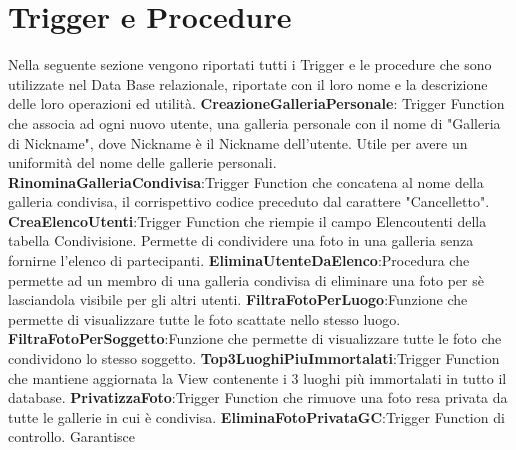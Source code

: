 \section{Trigger e Procedure}
Nella seguente sezione vengono riportati tutti i Trigger e le procedure che sono utilizzate nel Data Base relazionale, riportate con il loro nome e la descrizione delle loro operazioni ed utilità.
\newline
\newline
\textbf{CreazioneGalleriaPersonale}: Trigger Function che associa ad ogni nuovo utente, una galleria personale con il nome di "Galleria di Nickname", dove Nickname è il Nickname dell'utente. Utile per avere un uniformità del nome delle gallerie personali.
\newline
\newline
\textbf{RinominaGalleriaCondivisa}:Trigger Function che concatena al nome della galleria condivisa, il corrispettivo codice preceduto dal carattere "Cancelletto".
\newline
\newline
\textbf{CreaElencoUtenti}:Trigger Function che riempie il campo
Elencoutenti della tabella Condivisione. Permette di
condividere una foto in una galleria senza fornirne l’elenco di
partecipanti.
\newline
\newline
\textbf{EliminaUtenteDaElenco}:Procedura che permette ad un
membro di una galleria condivisa di eliminare una foto per sè
lasciandola visibile per gli altri utenti.
\newline
\newline
\newline
\textbf{FiltraFotoPerLuogo}:Funzione che permette di visualizzare tutte
le foto scattate nello stesso luogo.
\newline
\newline
\textbf{FiltraFotoPerSoggetto}:Funzione che permette di visualizzare
tutte le foto che condividono lo stesso soggetto.
\newline
\newline
\textbf{Top3LuoghiPiuImmortalati}:Trigger Function che mantiene
aggiornata la View contenente i 3 luoghi più immortalati in
tutto il database.
\newline
\newline
\textbf{PrivatizzaFoto}:Trigger Function che rimuove una foto resa
privata da tutte le gallerie in cui è condivisa.
\newline
\newline
\textbf{EliminaFotoPrivataGC}:Trigger Function di controllo. Garantisce
